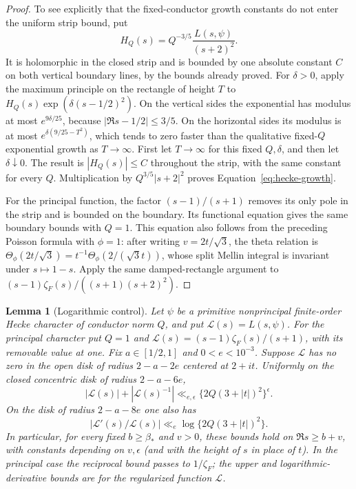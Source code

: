 \documentclass[11pt,a4paper]{article}
\numberwithin{equation}{section}
\numberwithin{figure}{section}
\newtheorem{lemma}[theorem]{Lemma}
\theoremstyle{definition}
\theoremstyle{remark}
\begin{document}
\begin{proof}
To see explicitly that the fixed-conductor growth constants do not enter
the uniform strip bound, put
\[
 H_Q(s)=Q^{-3/5}\frac{L(s,\psi)}{(s+2)^2}.
\]
It is holomorphic in the closed strip and is bounded by one absolute
constant $C$ on both vertical boundary lines, by the bounds already proved.
For $\delta>0$, apply the maximum principle on the rectangle of height $T$
to $H_Q(s)\exp(\delta(s-1/2)^2)$.  On the vertical sides the exponential
has modulus at most $e^{9\delta/25}$, because
$|\Re s-1/2|\le3/5$.  On the horizontal sides its modulus is at most
$e^{\delta(9/25-T^2)}$, which tends to zero faster than the qualitative
fixed-$Q$ exponential growth as $T\to\infty$.  First let $T\to\infty$ for
this fixed $Q,\delta$, and then let $\delta\downarrow0$.  The result is
$|H_Q(s)|\le C$ throughout the strip, with the same constant for every $Q$.
Multiplication by $Q^{3/5}|s+2|^2$ proves
Equation~\eqref{eq:hecke-growth}.

For the principal function, the factor $(s-1)/(s+1)$ removes its only pole
in the strip and is bounded on the boundary.  Its functional equation gives
the same boundary bounds with $Q=1$.  This equation also follows from the
preceding Poisson formula with $\phi=1$: after writing $v=2t/\sqrt3$, the
theta relation is
$\Theta_\phi(2t/\sqrt3)=t^{-1}\Theta_\phi(2/(\sqrt3t))$, whose split Mellin
integral is invariant under $s\mapsto1-s$.  Apply the same damped-rectangle
argument to $(s-1)\zeta_F(s)/((s+1)(s+2)^2)$.
\end{proof}

\begin{lemma}[Logarithmic control]\label{lem:logarithmic-control}
Let $\psi$ be a primitive nonprincipal finite-order Hecke character of
conductor norm $Q$, and put $\mathcal L(s)=L(s,\psi)$.  For the principal
character put $Q=1$ and
$\mathcal L(s)=(s-1)\zeta_F(s)/(s+1)$, with its removable value at one.
Fix $a\in[1/2,1]$ and $0<e<10^{-3}$.  Suppose $\mathcal L$ has no zero in
the open disk of radius $2-a-2e$ centered at $2+it$.  Uniformly on the
closed concentric disk of radius $2-a-6e$,
\begin{equation}\label{eq:disk-control}
 |\mathcal L(s)|+|\mathcal L(s)^{-1}|
 \ll_{e,\epsilon}\{2Q(3+|t|)^2\}^{\epsilon}.
\end{equation}
On the disk of radius $2-a-8e$ one also has
\[
 |\mathcal L'(s)/\mathcal L(s)|\ll_e\log\{2Q(3+|t|)^2\}.
\]
In particular, for every fixed $b\ge\beta_*$ and $v>0$, these bounds hold
on $\Re s\ge b+v$, with constants depending on $v,\epsilon$ (and with the
height of $s$ in place of $t$).  In the principal case the reciprocal bound
passes to $1/\zeta_F$; the upper and logarithmic-derivative bounds are for
the regularized function $\mathcal L$.
\end{lemma}
\end{document}
